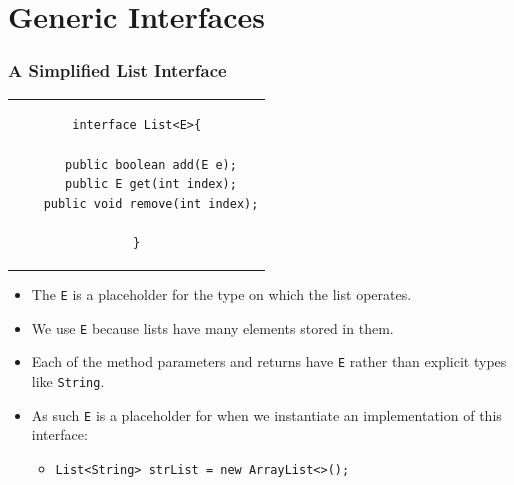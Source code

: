 \documentclass{beamer}
\begin{document}
\section{Generic Interfaces}
\begin{frame}[fragile]
    \frametitle{A Simplified List Interface}
    \begin{center}
        \begin{tabular}{c}
            \begin{lstlisting}[basicstyle=\scriptsize]
interface List<E>{

    public boolean add(E e);
    public E get(int index);
    public void remove(int index);

}
            \end{lstlisting}
        \end{tabular}
    \end{center}
    \begin{itemize}
        \item The \lstinline|E| is a placeholder for the type on which the list operates.
            
        \item We use \lstinline|E| because lists have many elements stored in them.
            
        \item Each of the method parameters and returns have \lstinline|E| rather than explicit types like \lstinline|String|.
            
        \item As such \lstinline|E| is a placeholder for when we instantiate an implementation of this interface:
        \begin{itemize}
            \item \lstinline|List<String> strList = new ArrayList<>();|
        \end{itemize}
    \end{itemize}
\end{frame}
\end{document}

